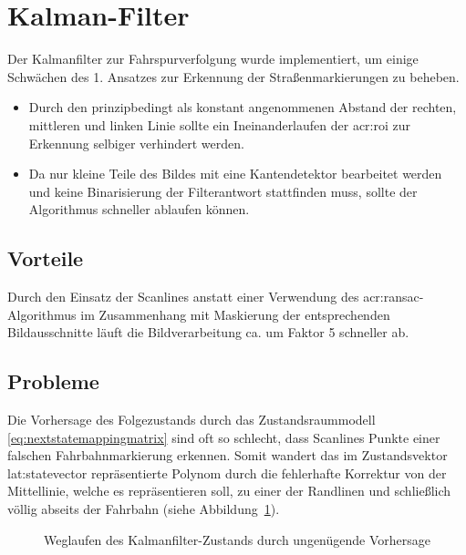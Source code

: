 \section{Kalman-Filter \dcsecondauthorshort}

Der Kalmanfilter zur Fahrspurverfolgung wurde implementiert, um einige Schwächen des 1. Ansatzes zur Erkennung der Straßenmarkierungen zu beheben.
\begin{itemize}
\item Durch den prinzipbedingt als konstant angenommenen Abstand der rechten, mittleren und linken Linie sollte ein \glqq Ineinanderlaufen \grqq der \gls{acr:roi} zur Erkennung selbiger verhindert werden.
\item Da nur kleine Teile des Bildes mit eine Kantendetektor bearbeitet werden und keine Binarisierung der Filterantwort stattfinden muss, sollte der Algorithmus schneller ablaufen können.
\end{itemize}

\subsection{Vorteile}
Durch den Einsatz der Scanlines anstatt einer Verwendung des \gls{acr:ransac}-Algorithmus im Zusammenhang mit Maskierung der entsprechenden Bildausschnitte läuft die Bildverarbeitung ca. um Faktor 5 schneller ab.

\subsection{Probleme}
Die Vorhersage des Folgezustands durch das Zustandsraummodell \eqref{eq:nextstatemappingmatrix} sind oft so schlecht, dass Scanlines Punkte einer falschen Fahrbahnmarkierung erkennen. Somit \glqq wandert \grqq das im Zustandsvektor \gls{lat:statevector} repräsentierte Polynom durch die fehlerhafte Korrektur von der Mittellinie, welche es repräsentieren soll, zu einer der Randlinen und schließlich völlig abseits der Fahrbahn (siehe Abbildung~\ref{fig:evaluation:kalman:weggezogen}).

\begin{figure}[ht] %
	\centering
	\quad
	\quad
	\quad
	\quad
	\caption{\glqq Weglaufen \grqq des Kalmanfilter-Zustands durch ungenügende Vorhersage}
	\label{fig:evaluation:kalman:weggezogen}
\end{figure}

